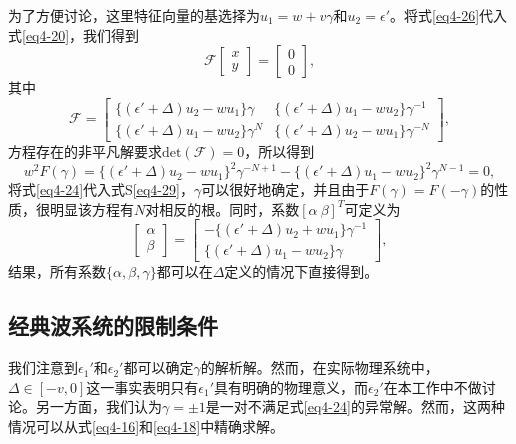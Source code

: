为了方便讨论，这里特征向量的基选择为\(u_{1}=w + v\gamma\)和\(u_{2}=\epsilon'\)。将式\ref{eq4-26}代入式\ref{eq4-20}，我们得到
\begin{equation}\label{eq4-27}
    \mathcal{F}\begin{bmatrix}x\\y\end{bmatrix}=\begin{bmatrix}0\\0\end{bmatrix},
\end{equation}
其中
\begin{equation}\label{eq4-28}
    \mathcal{F}=\begin{bmatrix}\{(\epsilon'+\Delta)u_{2}-wu_{1}\}\gamma&\{(\epsilon'+\Delta)u_{1}-wu_{2}\}\gamma^{-1}\\\{(\epsilon'+\Delta)u_{1}-wu_{2}\}\gamma^{N}&\{(\epsilon'+\Delta)u_{2}-wu_{1}\}\gamma^{-N}\end{bmatrix},
\end{equation}
方程存在的非平凡解要求\(\mathrm{det}(\mathcal{F}) = 0\)，所以得到
\begin{equation}\label{eq4-29}
    w^{2}F(\gamma)=\{(\epsilon'+\Delta)u_{2}-wu_{1}\}^{2}\gamma^{-N + 1}-\{(\epsilon'+\Delta)u_{1}-wu_{2}\}^{2}\gamma^{N - 1}=0,
\end{equation}
将式\ref{eq4-24}代入式S\ref{eq4-29}，\(\gamma\)可以很好地确定，并且由于\(F(\gamma)=F(-\gamma)\)的性质，很明显该方程有\(N\)对相反的根。同时，系数\([\alpha\ \beta]^{T}\)可定义为
\begin{equation}\label{eq4-30}
    \begin{bmatrix}\alpha\\\beta\end{bmatrix}=\begin{bmatrix}-\{(\epsilon'+\Delta)u_{2}+wu_{1}\}\gamma^{-1}\\\{(\epsilon'+\Delta)u_{1}-wu_{2}\}\gamma\end{bmatrix},
\end{equation}
结果，所有系数\(\{\alpha,\beta,\gamma\}\)都可以在\(\Delta\)定义的情况下直接得到。

\subsection{经典波系统的限制条件}

我们注意到\(\epsilon_{1}'\)和\(\epsilon_{2}'\)都可以确定\(\gamma\)的解析解。然而，在实际物理系统中，\(\Delta\in[-v,0]\)这一事实表明只有\(\epsilon_{1}'\)具有明确的物理意义，而\(\epsilon_{2}'\)在本工作中不做讨论。另一方面，我们认为\(\gamma=\pm1\)是一对不满足式\ref{eq4-24}的异常解。然而，这两种情况可以从式\ref{eq4-16}和\ref{eq4-18}中精确求解。

